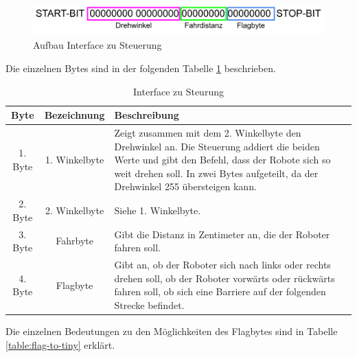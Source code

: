 \begin{figure}[H]
\centering
\includegraphics[width=\textwidth]{assets/IT/interface-tiny.png}
\caption{Aufbau Interface zu Steuerung}
\label{fig:interface-tiny}
\end{figure}

Die einzelnen Bytes sind in der folgenden Tabelle \ref{table:interface-to-tiny} beschrieben.

\begin{table}[H]
\centering
\small
\begin{tabularx}{\textwidth}{|c|c|X|}
\hline
  \textbf{Byte} &\textbf{Bezeichnung} & \textbf{Beschreibung}\\
  \hline
      1. Byte&1. Winkelbyte &Zeigt zusammen mit dem 2. Winkelbyte den Drehwinkel an. Die Steuerung addiert die beiden Werte und gibt den Befehl, dass der Robote sich so weit drehen soll. In zwei Bytes aufgeteilt, da der Drehwinkel 255 übersteigen kann.\\
  \hline
2. Byte&2. Winkelbyte&Siehe 1. Winkelbyte.\\
  \hline
  3. Byte&Fahrbyte&Gibt die Distanz in Zentimeter an, die der Roboter fahren soll.\\
  \hline
  4. Byte&Flagbyte&Gibt an, ob der Roboter sich nach links oder rechts drehen soll, ob der Roboter vorwärts oder rückwärts fahren soll, ob sich eine Barriere auf der folgenden Strecke befindet.\\
  \hline
  \end{tabularx}
\caption{Interface zu Steurung}
\label{table:interface-to-tiny}
\end{table}

Die einzelnen Bedeutungen zu den Möglichkeiten des Flagbytes sind in Tabelle \ref{table:flag-to-tiny} erklärt.

